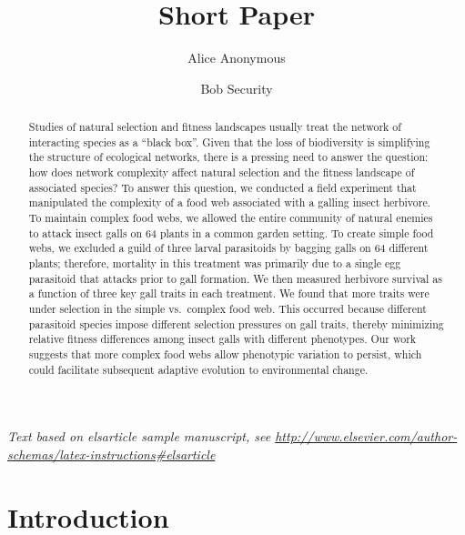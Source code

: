\documentclass[]{elsarticle} %
\begin{document}
\begin{frontmatter}

  \title{Short Paper}
    \author[Some Institute of Technology]{Alice Anonymous}
    \author[Another University]{Bob Security}
  
      \address[Some Institute of Technology]{Department, Street, City, State, Zip}
    \address[Another University]{Department, Street, City, State, Zip}
  
  \begin{abstract}
  Studies of natural selection and fitness landscapes usually treat the
  network of interacting species as a ``black box''. Given that the loss
  of biodiversity is simplifying the structure of ecological networks,
  there is a pressing need to answer the question: how does network
  complexity affect natural selection and the fitness landscape of
  associated species? To answer this question, we conducted a field
  experiment that manipulated the complexity of a food web associated with
  a galling insect herbivore. To maintain complex food webs, we allowed
  the entire community of natural enemies to attack insect galls on 64
  plants in a common garden setting. To create simple food webs, we
  excluded a guild of three larval parasitoids by bagging galls on 64
  different plants; therefore, mortality in this treatment was primarily
  due to a single egg parasitoid that attacks prior to gall formation. We
  then measured herbivore survival as a function of three key gall traits
  in each treatment. We found that more traits were under selection in the
  simple vs.~complex food web. This occurred because different parasitoid
  species impose different selection pressures on gall traits, thereby
  minimizing relative fitness differences among insect galls with
  different phenotypes. Our work suggests that more complex food webs
  allow phenotypic variation to persist, which could facilitate subsequent
  adaptive evolution to environmental change.
  \end{abstract}
  
 \end{frontmatter}

\emph{Text based on elsarticle sample manuscript, see
\url{http://www.elsevier.com/author-schemas/latex-instructions\#elsarticle}}

\section{Introduction}\label{introduction}
\end{document}
